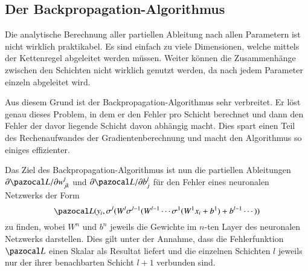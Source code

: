 \subsection{Der Backpropagation-Algorithmus}

%
%
%
%
Die analytische Berechnung aller partiellen Ableitung nach allen Parametern 
ist nicht wirklich praktikabel.
Es sind einfach zu viele Dimensionen, welche mittels der Kettenregel
abgeleitet werden müssen.
Weiter können die Zusammenhänge zwischen
den Schichten nicht wirklich genutzt werden, da nach jedem Parameter
einzeln abgeleitet wird.

Aus diesem Grund ist der Backpropagation-Algorithmus sehr verbreitet.
Er löst genau dieses Problem, in dem er den Fehler pro Schicht berechnet und dann den Fehler der davor liegende Schicht davon abhängig macht.
Dies spart einen Teil des Rechenaufwandes der Gradientenberechnung und macht den Algorithmus so einiges effizienter.

Das Ziel des Backpropagation-Algorithmus ist nun die partiellen Ableitungen $\partial \Lb / \partial w^l_{jk}$ und $\partial \Lb / \partial b^l_j$ für den Fehler eines neuronalen Netzwerks der Form
\begin{equation}
\Lb(y_{i}, \sigma^{l}(W^{l}\sigma^{l-1}(W^{l-1}\cdots \sigma^{1}(W^{1}x_i+b^{1}) + b^{l-1} \cdots ) )
\end{equation}
zu finden, wobei $W^{n}$ und $b^{n}$ jeweils die Gewichte im $n$-ten Layer des neuronalen Netzwerks darstellen.
Dies gilt unter der Annahme, dass die Fehlerfunktion $\Lb$ einen Skalar
als Resultat liefert und die einzelnen Schichten $l$ jeweils nur der
ihrer benachbarten Schicht $l+1$ verbunden sind.

